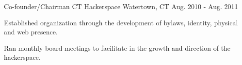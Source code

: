 \begin{cventries}
  \cventry
    {Co-founder/Chairman} %
    {CT Hackerspace} %
    {Watertown, CT} %
    {Aug. 2010 - Aug. 2011} %
    {
      \begin{cvitems} %
      \item {Established organization through the development of bylaws,
              identity, physical and web presence.}
      \item {Ran monthly board meetings to facilitate in the growth and direction of the hackerspace.}
      \end{cvitems}
    }

\end{cventries}
